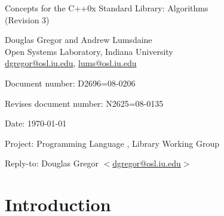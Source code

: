 \documentclass[american,twoside]{book}
\begin{document}
\raggedbottom

\begin{titlepage}
\begin{center}
\huge
Concepts for the C++0x Standard Library: Algorithms \\
(Revision 3)

\vspace{0.5in}

\normalsize
Douglas Gregor and Andrew Lumsdaine \\
Open Systems Laboratory, Indiana University \\
\href{mailto:dgregor@osl.iu.edu}{dgregor@osl.iu.edu}, \href{mailto:lums@osl.iu.edu}{lums@osl.iu.edu}
\end{center}

\vspace{1in}
\par\noindent Document number: D2696=08-0206\vspace{-6pt}
\par\noindent Revises document number: N2625=08-0135\vspace{-6pt}
\par\noindent Date: \today\vspace{-6pt}
\par\noindent Project: Programming Language \Cpp{}, Library Working Group\vspace{-6pt}
\par\noindent Reply-to: Douglas Gregor $<$\href{mailto:dgregor@osl.iu.edu}{dgregor@osl.iu.edu}$>$\vspace{-6pt}

\section*{Introduction}

\end{titlepage}
\end{document}
